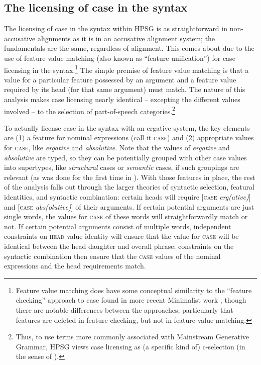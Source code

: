 \documentclass[output=paper
                ,modfonts
                ,nonflat
	        ,collection
	        ,collectionchapter
	        ,collectiontoclongg
 	        ,biblatex
                ,babelshorthands
                ,newtxmath
                ,draftmode
                ,colorlinks, citecolor=brown
]{./langsci/langscibook}
\begin{document}
{\subsection{The licensing of case in the syntax}

The licensing of case in the syntax within HPSG is as straightforward in non-accusative alignments as it is in an accusative alignment system; the fundamentals are the same, regardless of alignment. This comes about due to the use of feature value matching (also known as ``feature unification'') for case licensing in the syntax.\footnote{Feature value matching does have some conceptual similarity to the ``feature checking'' approach to case found in more recent Minimalist work \citep{Chomsky91a-u,Chomsky93b-u,adger2000,Adger2010a,framgut06,pestor07}, though there are notable differences between the approaches, particularly that features are deleted in feature checking, but not in feature value matching.} The simple premise of feature value matching is that a value for a particular feature possessed by an argument and a feature value required by its head (for that same argument) must match. The nature of this analysis makes case licensing nearly identical -- excepting the different values involved -- to the selection of part-of-speech categories.\footnote{Thus, to use terms more commonly associated with Mainstream Generative Grammar, HPSG views case licensing as (a specific kind of) c-selection (in the sense of \citealt{Grimshaw79a-u}).}    

To actually license case in the syntax with an ergative system, the key elements are (1) a feature for nominal expressions (call it \textsc{case}) and (2) appropriate values for \textsc{case}, like \textit{ergative} and \textit{absolutive}. Note that the values of \textit{ergative} and \textit{absolutive} are typed, so they can be potentially grouped with other case values into supertypes, like \textit{structural} cases or \textit{semantic} cases, if such groupings are relevant (as was done for the first time in \citealt{HM94a}). With those features in place, the rest of the analysis falls out through the larger theories of syntactic selection, featural identities, and syntactic combination: certain heads will require [\textsc{case} \textit{erg(ative)}] and [\textsc{case} \textit{abs(olutive)}] of their arguments. If certain potential arguments are just single words, the values for \textsc{case} of these words will straightforwardly match or not. If certain potential arguments consist of multiple words, independent constraints on \textsc{head} value identity will ensure that the value for \textsc{case} will be identical between the head daughter and overall phrase; constraints on the syntactic combination then ensure that the \textsc{case} values of the nominal expressions and the head requirements match. 

}
\end{document}
